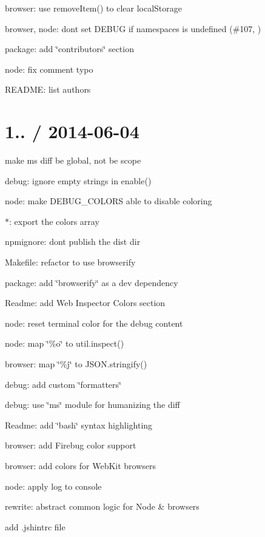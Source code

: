 \begin{DoxyItemize}
\item browser\+: use {\ttfamily remove\+Item()} to clear local\+Storage
\item browser, node\+: don\textquotesingle{}t set D\+E\+B\+UG if namespaces is undefined (\#107, )
\item package\+: add \char`\"{}contributors\char`\"{} section
\item node\+: fix comment typo
\item R\+E\+A\+D\+ME\+: list authors
\end{DoxyItemize}

\section*{1.. / 2014-\/06-\/04 }


\begin{DoxyItemize}
\item make ms diff be global, not be scope
\item debug\+: ignore empty strings in enable()
\item node\+: make D\+E\+B\+U\+G\+\_\+\+C\+O\+L\+O\+RS able to disable coloring
\item $\ast$\+: export the {\ttfamily colors} array
\item npmignore\+: don\textquotesingle{}t publish the {\ttfamily dist} dir
\item Makefile\+: refactor to use browserify
\item package\+: add \char`\"{}browserify\char`\"{} as a dev dependency
\item Readme\+: add Web Inspector Colors section
\item node\+: reset terminal color for the debug content
\item node\+: map \char`\"{}\%o\char`\"{} to {\ttfamily util.\+inspect()}
\item browser\+: map \char`\"{}\%j\char`\"{} to {\ttfamily J\+S\+O\+N.\+stringify()}
\item debug\+: add custom \char`\"{}formatters\char`\"{}
\item debug\+: use \char`\"{}ms\char`\"{} module for humanizing the diff
\item Readme\+: add \char`\"{}bash\char`\"{} syntax highlighting
\item browser\+: add Firebug color support
\item browser\+: add colors for Web\+Kit browsers
\item node\+: apply log to {\ttfamily console}
\item rewrite\+: abstract common logic for Node \& browsers
\item add .jshintrc file
\end{DoxyItemize}


